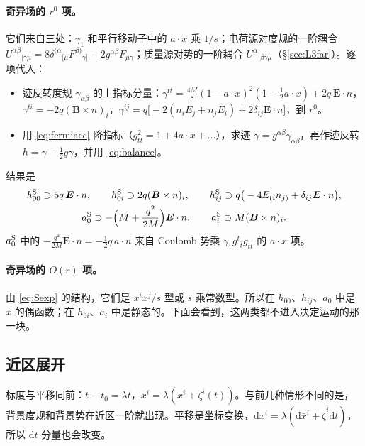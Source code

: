 \documentclass[11pt,a4paper]{ctexart}
\numberwithin{equation}{section}
\newcommand{\dd}{\mathrm d}
\begin{document}
\paragraph{奇异场的 $r^0$ 项。}它们来自三处：$\gamma_1$ 和平行移动子中的 $a\cdot x$ 乘 $1/s$；电荷源对度规的一阶耦合 $U^{\alpha\beta}{}_{|\gamma\mu}=8\delta^{(\alpha}{}_{[\mu}F^{\beta)}{}_{\gamma]}-2g^{\alpha\beta}F_{\mu\gamma}$；质量源对势的一阶耦合 $U^\alpha{}_{|\beta\gamma\mu}$（\S\ref{sec:L3far}）。逐项代入：
\begin{itemize}
\item 迹反转度规 $\gamma_{\alpha\beta}$ 的上指标分量：$\gamma^{tt}=\frac{4M}s(1-a\cdot x)^2(1-\tfrac12a\cdot x)+2q\,\boldsymbol E\cdot n$，$\gamma^{ti}=-2q(\boldsymbol B\times n)_i$，$\gamma^{ij}=q\big[-2(n_iE_j+n_jE_i)+2\delta_{ij}\boldsymbol E\cdot n\big]$，到 $r^0$。
\item 用 \eqref{eq:fermiacc} 降指标（$g_{tt}^2=1+4a\cdot x+\dots$），求迹 $\gamma=g^{\alpha\beta}\gamma_{\alpha\beta}$，再作迹反转 $h=\gamma-\tfrac12g\gamma$，并用 \eqref{eq:balance}。
\end{itemize}
结果是
\begin{gather}
h^{\rm S}_{00}\supset5q\,\boldsymbol E\cdot n,\qquad
h^{\rm S}_{0i}\supset2q(\boldsymbol B\times n)_i,\qquad
h^{\rm S}_{ij}\supset q\big(-4E_{(i}n_{j)}+\delta_{ij}\boldsymbol E\cdot n\big),\nonumber\\
a^{\rm S}_0\supset-\Big(M+\frac{q^2}{2M}\Big)\boldsymbol E\cdot n,\qquad
a^{\rm S}_i\supset M(\boldsymbol B\times n)_i .
\label{eq:S4r0}
\end{gather}
$a^{\rm S}_0$ 中的 $-\tfrac{q^2}{2M}\boldsymbol E\cdot n=-\tfrac12q\,a\cdot n$ 来自 Coulomb 势乘 $\gamma_1g^t{}_{\bar t}g_{tt}$ 的 $a\cdot x$ 项。

\paragraph{奇异场的 $O(r)$ 项。}由 \eqref{eq:Sexp} 的结构，它们是 $x^ix^j/s$ 型或 $s$ 乘常数型。所以在 $h_{00}$、$h_{ij}$、$a_0$ 中是 $x$ 的偶函数；在 $h_{0i}$、$a_i$ 中是静态的。下面会看到，这两类都不进入决定运动的那一块。

\subsection{近区展开}
\label{sec:L4near}

标度与平移同前：$t-t_0=\lambda\bar t$，$x^i=\lambda(\bar x^i+\zeta^i(t))$。与前几种情形不同的是，背景度规和背景势在近区一阶就出现。平移是坐标变换，$\dd x^i=\lambda(\dd\bar x^i+\dot\zeta^i\dd t)$，所以 $\dd t$ 分量也会改变。
\end{document}
